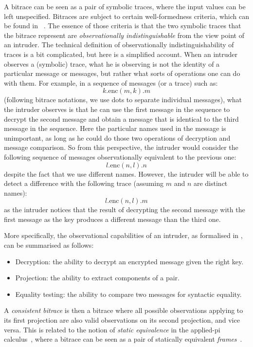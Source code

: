 \documentclass{article}
\begin{document}
A bitrace can be seen as a pair of symbolic traces, where the input values can be left unspecified. 
Bitraces are subject to certain well-formedness criteria, which can be found in ~\cite{tiu09corr}. 
The essence of those criteria is that the two symbolic traces that the bitrace represent are
{\em observationally indistinguishable} from the view point of an intruder.
The technical definition of observationally indistinguishability of traces is a bit complicated,
but here is a simplified account. When an intruder observes a (symbolic) trace, what he is observing
is not the identity of a particular message or messages, but rather what sorts of operations
one can do with them. For example, in a sequence of messages (or a trace) such as:
$$k . \mathrm{enc}(m, k) . m$$
(following bitrace notations, we use dots to separate individual messages), what
the intruder observes is that he can use the first message in the sequence to
decrypt the second message and obtain a message that is identical to the third message
in the sequence. Here the particular names used in the 
message is unimportant, as long as he could do those two operations of decryption and
message comparison. So from this perspective, the intruder would consider the following
sequence of messages observationally equivalent to the previous one:
$$l . \mathrm{enc}(n, l) . n$$
despite the fact that we use different names. However, the intruder will be able to detect
a difference with the following trace (assuming $m$ and $n$ are distinct names):
$$l . \mathrm{enc}(n, l) . m$$
as the intruder notices that the result of decrypting the second message with the first
message as the key produces a different message than the third one.

More specifically, the observational capabilities of an intruder, as formalised in \cite{abadi98njc},
can be summarised as follows:
\begin{itemize}
\item Decryption: the ability to decrypt an encrypted message given the right key. 
\item Projection: the ability to extract components of a pair. 
\item Equality testing: the ability to compare two messages for syntactic equality. 
\end{itemize}

A {\em consistent bitrace} is then a bitrace where all possible observations applying
to its first projection are also valid observations on its second projection, and vice versa. 
This is related to the notion of {\em static equivalence} in the applied-pi calculus~\cite{abadi01popl},
where a bitrace can be seen as a pair of statically equivalent {\em frames}~\cite{abadi01popl}. 
\end{document}
